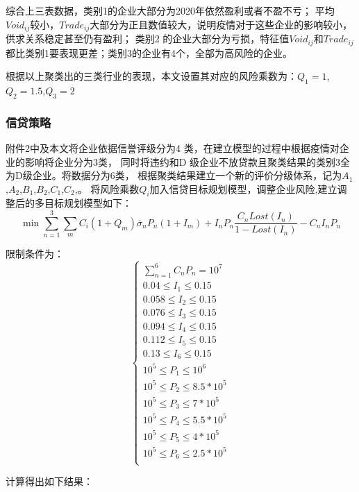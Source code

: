 \documentclass[UTF8]{ctexart}
\begin{document}
综合上三表数据，类别1的企业大部分为2020年依然盈利或者不盈不亏；
平均$Void_{ij}$较小，$Trade_{ij}$大部分为正且数值较大，说明疫情对于这些企业的影响较小，供求关系稳定甚至仍有盈利；
类别2 的企业大部分为亏损，特征值$Void_{ij}$和$Trade_{ij}$都比类别1要表现更差；类别3的企业有4个，全部为高风险的企业。

根据以上聚类出的三类行业的表现，本文设置其对应的风险乘数为：$Q_1=1$,$Q_2=1.5$,$Q_3=2$


\subsubsection{信贷策略}
附件2中及本文将企业依据信誉评级分为4 类，在建立模型的过程中根据疫情对企业的影响将企业分为3类，
同时将违约和D 级企业不放贷款且聚类结果的类别3全为D级企业。将数据分为6类，
根据聚类结果建立一个新的评价分级体系，记为$A_1$,$A_2$,$B_1$,$B_2$,$C_1$,$C_2$,。
将风险乘数$Q_i$加入信贷目标规划模型，调整企业风险,建立调整后的多目标规划模型如下：
\begin{equation}
	\min \sum_{n = 1}^{3}\sum_{m}C_i(1+Q_m)\overline{\sigma }_n P_n (1+I_m)+I_n P_n \frac{C_n Lost(I_n)}{1-Lost(I_n)}-C_n I_n P_n
\end{equation}

限制条件为：
\[\left\{\begin{array}{lllll}
		\sum_{n = 1}^{6}C_n  P_n = 10^7 \\
		0.04 \le I_1 \le 0.15           \\
		0.058 \le I_2 \le 0.15          \\
		0.076 \le I_3 \le 0.15          \\
		0.094 \le I_4 \le 0.15          \\
		0.112 \le I_5 \le 0.15          \\
		0.13 \le I_6 \le 0.15           \\
		10^5 \le P_1 \le 10^6           \\
		10^5 \le P_2 \le 8.5*10^5       \\
		10^5 \le P_3 \le 7*10^5         \\
		10^5 \le P_4 \le 5.5*10^5       \\
		10^5 \le P_5 \le 4*10^5         \\
		10^5 \le P_6 \le 2.5*10^5       \\
	\end{array}\right. \]

计算得出如下结果：
\end{document}
